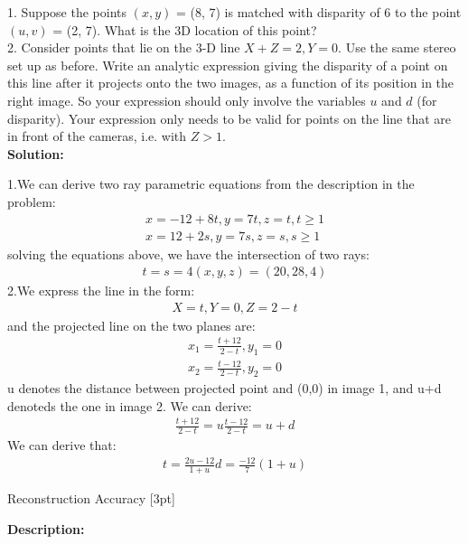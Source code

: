 \documentclass{assignment}
\begin{document}
\begin{problemlist}
1. Suppose the points $(x, y)$ = (8, 7) is matched with disparity of 6 to the point $(u, v)$ = (2, 7). What is the 3D location of this point?\\

2. Consider points that lie on the 3-D line $X + Z = 2,Y = 0$. Use the same stereo set up as before. Write an analytic expression giving the disparity of a point on this line after it projects onto the two images, as a function of its position in the right image. So your expression should only involve the variables $u$ and $d$ (for disparity). Your expression only needs to be valid for points on the line that are in front of the cameras, i.e. with $Z > 1$.\\

\textbf{Solution:}

1.We can derive two ray parametric equations from the description in the problem:
\begin{align*}
    x = -12 + 8t, y = 7t, z = t, t\geq1\\
    x = 12 + 2s, y = 7s, z = s, s\geq1
\end{align*}
solving the equations above, we have the intersection of two rays:
\begin{align*}
    t = s = 4
    (x,y,z) = (20,28,4)
\end{align*}
2.We express the line in the form:
\begin{align*}
    X = t, Y = 0, Z = 2-t
\end{align*}
and the projected line on the two planes are:
\begin{align*}
    x_1 = \frac{t+12}{2-t}, y_1 = 0\\
    x_2 = \frac{t-12}{2-t}, y_2 = 0
\end{align*}
u denotes the distance between projected point and (0,0) in image 1, and u+d denoteds the one in image 2. We can derive:
\begin{align*}
    \frac{t+12}{2-t} = u
    \frac{t-12}{2-t} = u+d
\end{align*}
We can derive that:
\begin{align*}
    t = \frac{2u-12}{1+u}
    d = \frac{-12}{7}(1+u)
\end{align*}

\newpage
\pbitem Reconstruction Accuracy [3pt]

\textbf{Description:}


\end{problemlist}
\end{document}
